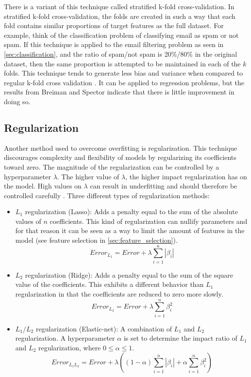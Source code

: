 	There is a variant of this technique called stratified k-fold cross-validation. In stratified k-fold cross-validation, the folds are created in such a way that each fold contains similar proportions of target features as the full dataset. For example, think of the classification problem of classifying email as spam or not spam. If this technique is applied to the email filtering problem as seen in \ref{sec:classification}, and the ratio of spam/not spam is 20\%/80\% in the original dataset, then the same proportion is attempted to be maintained in each of the $k$ folds. This technique tends to generate less bias and variance when compared to regular k-fold cross validation \cite{IP:2}. It can be applied to regression problems, but the results from Breiman and Spector \cite{ARTICLE:5} indicate that there is little improvement in doing so.

	\subsection{Regularization} \label{sec:regularization}
	Another method used to overcome overfitting is regularization. This technique discourages complexity and flexibility of models by regularizing its coefficients toward zero. The magnitude of the regularization can be controlled by a hyperparameter $\lambda$. The higher value of $\lambda$, the higher impact regularization has on the model. High values on $\lambda$ can result in underfitting and should therefore be controlled carefully \cite{WEBSITE:13}. Three different types of regularization methods:

\begin{itemize}
	\item{$L_1$ regularization (Lasso):} Adds a penalty equal to the sum of the absolute values of $n$ coefficients. This kind of regularization can nullify parameters and for that reason it can be seen as a way to limit the amount of features in the model (see feature selection in \ref{sec:feature_selection}).
		\begin{equation}
			Error_{L_1} = Error + \lambda \sum_{i=1}^{n}|\beta_i| 
		\end{equation}
	\item{$L_2$ regularization (Ridge):} Adds a penalty equal to the sum of the square value of the coefficients. This exhibits a different behavior than $L_1$ regularization in that the coefficients are reduced to zero more slowly.
		\begin{equation}
			Error_{L_2} = Error + \lambda \sum_{i=1}^{n}\beta_i^2 
		\end{equation}
	\item{$L_1/L_2$ regularization (Elastic-net):} A combination of $L_1$ and $L_2$ regularization. A hyperparameter $\alpha$ is set to determine the impact ratio of $L_1$ and $L_2$ regularization, where $0 \leq \alpha \leq 1$.
 		\begin{equation}
			Error_{L_1L_2} = Error + \lambda ( (1-\alpha)\sum_{i=1}^{n}|\beta_i| + \alpha  \sum_{i=1}^{n}\beta_i^2 ) 
		\end{equation}
\end{itemize}


